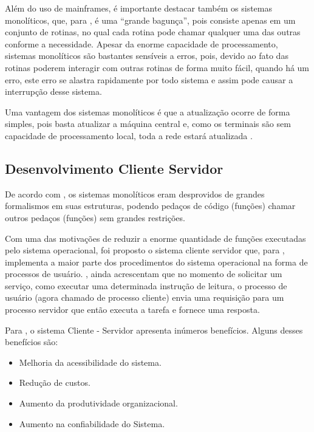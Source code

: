 Além do uso de mainframes, é importante destacar também os sistemas monolíticos, que, para , é uma “grande bagunça”, pois consiste apenas em um conjunto de rotinas, no qual cada rotina pode chamar qualquer uma das outras conforme a necessidade. Apesar da enorme capacidade de processamento, sistemas monolíticos são bastantes sensíveis a erros, pois, devido ao fato das rotinas poderem interagir com outras rotinas de forma muito fácil, quando há um erro, este erro se alastra rapidamente por todo sistema e assim pode causar a interrupção desse sistema.
	
Uma vantagem dos sistemas monolíticos é que a atualização ocorre de forma simples, pois basta atualizar a máquina  central e, como os terminais são sem capacidade de processamento local, toda a rede estará atualizada \cite [p.~58]{Tanenbaum}.

\subsection{Desenvolvimento Cliente Servidor}
\label{Contex}
De acordo com , os sistemas monolíticos eram desprovidos de grandes formalismos em suas estruturas, podendo pedaços de código (funções) chamar outros pedaços (funções) sem grandes restrições.

Com uma das motivações de reduzir a enorme quantidade de funções executadas pelo sistema operacional, foi proposto o sistema cliente servidor que, para , implementa a maior parte dos procedimentos do sistema operacional na forma de processos de usuário. , ainda acrescentam que no momento de solicitar um serviço, como executar uma determinada instrução de leitura, o processo de usuário (agora chamado de processo cliente) envia uma requisição para um processo servidor que então executa a tarefa e fornece uma resposta.

Para , o sistema Cliente - Servidor apresenta inúmeros benefícios. Alguns desses benefícios são:

\begin{itemize}
 \item Melhoria da acessibilidade do sistema.
 \item Redução de custos.
 \item Aumento da produtividade organizacional.
 \item Aumento na confiabilidade do Sistema.
\end{itemize}



